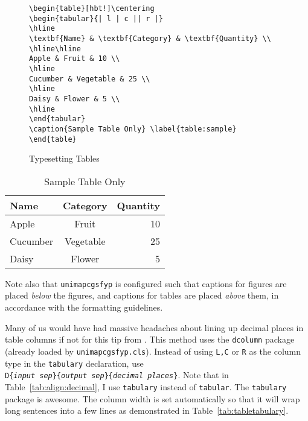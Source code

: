 \begin{figure}[hbt!]
\begin{lstlisting}
\begin{table}[hbt!]\centering
\begin{tabular}{| l | c || r |}
\hline
\textbf{Name} & \textbf{Category} & \textbf{Quantity} \\ 
\hline\hline
Apple & Fruit & 10 \\ 
\hline
Cucumber & Vegetable & 25 \\ 
\hline
Daisy & Flower & 5 \\ 
\hline
\end{tabular}
\caption{Sample Table Only} \label{table:sample}
\end{table}
\end{lstlisting}
\caption{Typesetting Tables}\label{fig:lst:table}
\end{figure}

\begin{table}[hbt!]\centering
\begin{tabular}{| l | c || r |}
\hline
\textbf{Name} & \textbf{Category} & \textbf{Quantity} \\ 
\hline\hline
Apple & Fruit & 10 \\ 
\hline
Cucumber & Vegetable & 25 \\ 
\hline
Daisy & Flower & 5 \\ 
\hline
\end{tabular}
\caption{Sample Table Only} \label{table:sample}
\end{table}

Note also that \verb|unimapcgsfyp| is configured such that captions for figures are placed \emph{below} the figures, and captions for tables are placed \emph{above} them, in accordance with the formatting guidelines.

Many of us would have had massive headaches about lining up decimal places in table columns if not for this tip from \citet[pp.~274--276]{latex:companion}. This method uses the \verb|dcolumn| package (already loaded by \verb|unimapcgsfyp.cls|). Instead of using \verb|L,C| or \verb|R| as the column type in the \verb|tabulary| declaration, use\\ \texttt{D\{\textit{input sep}\}\{\textit{output sep}\}\{\textit{decimal places}\}}. Note that in Table~\ref{tab:align:decimal}, I use \verb|tabulary| instead of \verb|tabular|. The \verb|tabulary| package is awesome. The column width is set automatically so that it will wrap long sentences into a few lines as demonstrated in Table~\ref{tab:tabletabulary}. 

